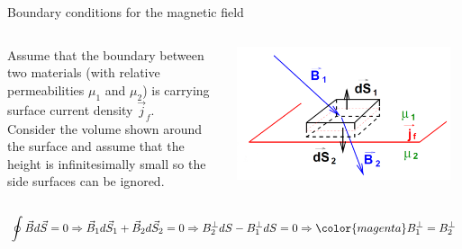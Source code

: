 \begin{frame}{Boundary conditions for the magnetic field}

\begin{columns}
  \begin{column}{0.50\textwidth}
  {\small
     Assume that the boundary between two materials (with relative
     permeabilities $\mu_1$ and  $\mu_2$)
     is carrying surface current density $\vec{j}_f$.\\
     Consider the volume shown around the surface and
     assume that the height is infinitesimally small so the side
     surfaces can be ignored.
  }
  \end{column}
  \begin{column}{0.50\textwidth}
    \begin{center}
      \includegraphics[width=0.95\textwidth]{./images/schematics/boundary_conditions_magnetic_field_1.png}\\
    \end{center}
  \end{column}
\end{columns}

\begin{equation*}
  \oint \vec{B} d\vec{S} = 0 \Rightarrow
     \vec{B}_1 d\vec{S}_1 + \vec{B}_2 d\vec{S}_2 = 0 \Rightarrow
       B_2^{\perp} dS - B_1^{\perp} dS = 0 \Rightarrow
         {\color{magenta} B_1^{\perp} = B_2^{\perp}}
\end{equation*}

\end{frame}

%
%
%

